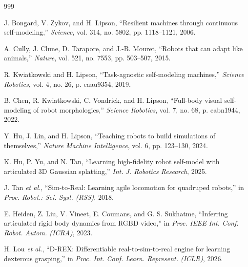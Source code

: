 ﻿\documentclass[12pt,a4paper,oneside]{report}
\begin{document}

\begin{thebibliography}{999}


J. Bongard, V. Zykov, and H. Lipson, ``Resilient machines through continuous self-modeling,'' \textit{Science}, vol. 314, no. 5802, pp. 1118--1121, 2006.


A. Cully, J. Clune, D. Tarapore, and J.-B. Mouret, ``Robots that can adapt like animals,'' \textit{Nature}, vol. 521, no. 7553, pp. 503--507, 2015.


R. Kwiatkowski and H. Lipson, ``Task-agnostic self-modeling machines,'' \textit{Science Robotics}, vol. 4, no. 26, p. eaau9354, 2019.


B. Chen, R. Kwiatkowski, C. Vondrick, and H. Lipson, ``Full-body visual self-modeling of robot morphologies,'' \textit{Science Robotics}, vol. 7, no. 68, p. eabn1944, 2022.


Y. Hu, J. Lin, and H. Lipson, ``Teaching robots to build simulations of themselves,'' \textit{Nature Machine Intelligence}, vol. 6, pp. 123--130, 2024.


K. Hu, P. Yu, and N. Tan, ``Learning high-fidelity robot self-model with articulated {3D} Gaussian splatting,'' \textit{Int. J. Robotics Research}, 2025.


J. Tan \textit{et al.}, ``{Sim-to-Real}: Learning agile locomotion for quadruped robots,'' in \textit{Proc. Robot.: Sci. Syst. (RSS)}, 2018.


E. Heiden, Z. Liu, V. Vineet, E. Coumans, and G. S. Sukhatme, ``Inferring articulated rigid body dynamics from RGBD video,'' in \textit{Proc. IEEE Int. Conf. Robot. Autom. (ICRA)}, 2023.


H. Lou \textit{et al.}, ``D-REX: Differentiable real-to-sim-to-real engine for learning dexterous grasping,'' in \textit{Proc. Int. Conf. Learn. Represent. (ICLR)}, 2026.


\end{thebibliography}
\end{document}
